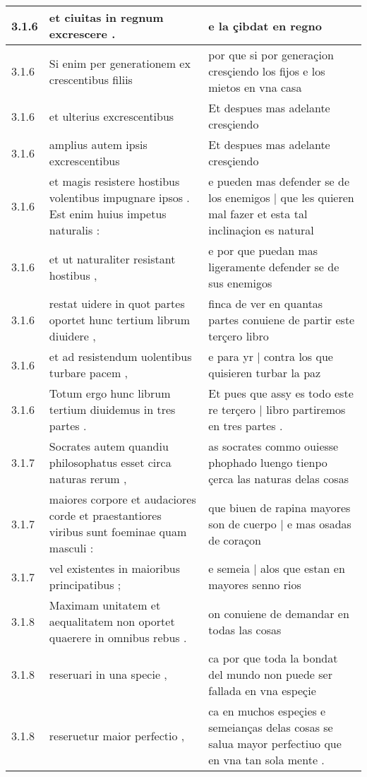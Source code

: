 \begin{tabular}{|p{1cm}|p{6.5cm}|p{6.5cm}|}
3.1.6 & et ciuitas in regnum excrescere . & e la çibdat en regno \\\hline
3.1.6 & Si enim per generationem ex crescentibus filiis & por que si por generaçion cresçiendo los fijos e los mietos en vna casa \\\hline
3.1.6 & et ulterius excrescentibus & Et despues mas adelante cresçiendo \\\hline
3.1.6 & amplius autem ipsis excrescentibus & Et despues mas adelante cresçiendo \\\hline
3.1.6 & et magis resistere hostibus volentibus impugnare ipsos . Est enim huius impetus naturalis : & e pueden mas defender se de los enemigos | que les quieren mal fazer et esta tal inclinaçion es natural \\\hline
3.1.6 & et ut naturaliter resistant hostibus , & e por que puedan mas ligeramente defender se de sus enemigos \\\hline
3.1.6 & restat uidere in quot partes oportet hunc tertium librum diuidere , & finca de ver en quantas partes conuiene de partir este terçero libro \\\hline
3.1.6 & et ad resistendum uolentibus turbare pacem , & e para yr | contra los que quisieren turbar la paz \\\hline
3.1.6 & Totum ergo hunc librum tertium diuidemus in tres partes . & Et pues que assy es todo este re terçero | libro partiremos en tres partes . \\\hline
3.1.7 & Socrates autem quandiu philosophatus esset circa naturas rerum , & as socrates commo ouiesse phophado luengo tienpo çerca las naturas delas cosas \\\hline
3.1.7 & maiores corpore et audaciores corde et praestantiores viribus sunt foeminae quam masculi : & que biuen de rapina mayores son de cuerpo | e mas osadas de coraçon \\\hline
3.1.7 & vel existentes in maioribus principatibus ; & e semeia | alos que estan en mayores senno rios \\\hline
3.1.8 & Maximam unitatem et aequalitatem non oportet quaerere in omnibus rebus . & on conuiene de demandar en todas las cosas \\\hline
3.1.8 & reseruari in una specie , & ca por que toda la bondat del mundo non puede ser fallada en vna espeçie \\\hline
3.1.8 & reseruetur maior perfectio , & ca en muchos espeçies e semeianças delas cosas se salua mayor perfectiuo que en vna tan sola mente . \\\hline

\end{tabular}

